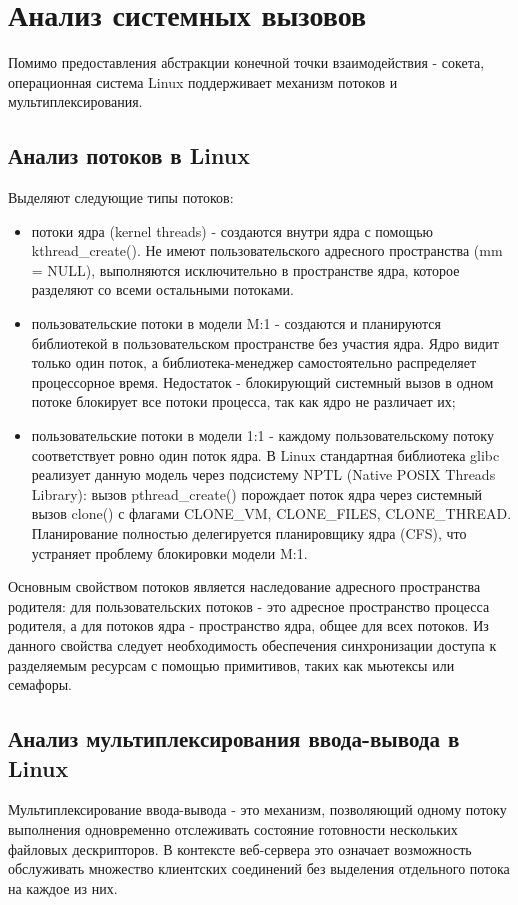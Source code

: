 \section{Анализ системных вызовов}
Помимо предоставления абстракции конечной точки взаимодействия - сокета,
операционная система Linux поддерживает механизм потоков и мультиплексирования. 

\subsection{Анализ потоков в Linux}
Выделяют следующие типы потоков:
\begin{itemize}
	\item потоки ядра (kernel threads) - создаются внутри ядра
	с помощью kthread\_create().
	Не имеют пользовательского адресного пространства (mm = NULL),
	выполняются исключительно в пространстве ядра,
	которое разделяют со всеми остальными потоками.
	\item пользовательские потоки в модели M:1 - создаются и планируются
	библиотекой в пользовательском пространстве без участия ядра.
	Ядро видит только один поток, а библиотека-менеджер
	самостоятельно распределяет процессорное время.
	Недостаток - блокирующий системный вызов в одном потоке
	блокирует все потоки процесса, так как ядро не различает их; \cite{nptl}
	\item пользовательские потоки в модели 1:1 - каждому пользовательскому потоку
	соответствует ровно один поток ядра.
	В Linux стандартная библиотека glibc реализует данную модель
	через подсистему NPTL (Native POSIX Threads Library):
	вызов pthread\_create()\cite{man} порождает поток ядра через системный вызов
	clone() с флагами CLONE\_VM, CLONE\_FILES,
	CLONE\_THREAD. \cite{drepper}
	Планирование полностью делегируется планировщику ядра (CFS),
	что устраняет проблему блокировки модели M:1. 
\end{itemize}

Основным свойством потоков является наследование адресного пространства родителя:
для пользовательских потоков - это адресное пространство процесса родителя,
а для потоков ядра - пространство ядра, общее для всех потоков.
Из данного свойства следует необходимость обеспечения синхронизации
доступа к разделяемым ресурсам с помощью примитивов,
таких как мьютексы или семафоры.

\subsection{Анализ мультиплексирования ввода-вывода в Linux}
Мультиплексирование ввода-вывода - это механизм, позволяющий одному потоку
выполнения одновременно отслеживать состояние готовности нескольких файловых
дескрипторов. В контексте веб-сервера это означает возможность обслуживать
множество клиентских соединений без выделения отдельного потока на каждое из них.

